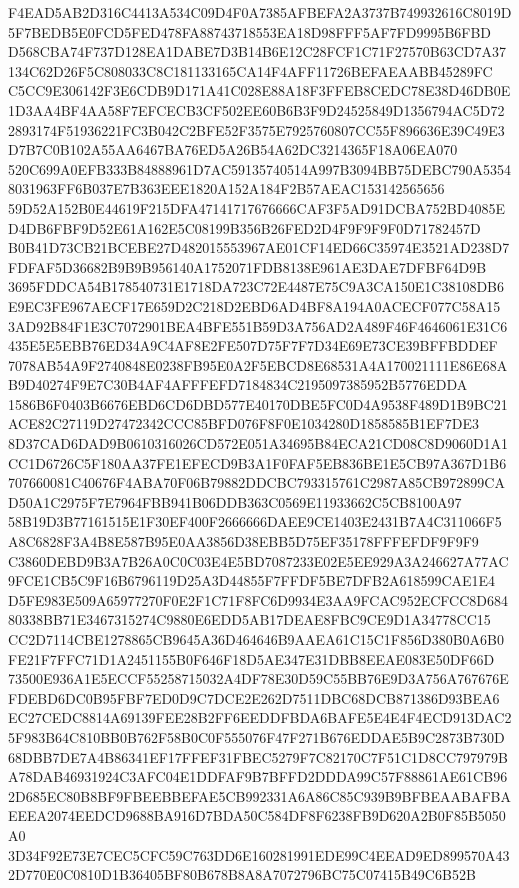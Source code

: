 \documentclass[UTF8,fontset=fandol,zihao=-4,a4paper]{ctexart}
\begin{document}
{{F4EAD5AB2D316C4413A534C09D4F0A7385AFBEFA2A3737B749932616C8019D5F7BEDB5E0FCD5FED478FA88743718553EA18D98FFF5AF7FD9995B6FBD
D568CBA74F737D128EA1DABE7D3B14B6E12C28FCF1C71F27570B63CD7A37134C62D26F5C808033C8C181133165CA14F4AFF11726BEFAEAABB45289FC
C5CC9E306142F3E6CDB9D171A41C028E88A18F3FFEB8CEDC78E38D46DB0E1D3AA4BF4AA58F7EFCECB3CF502EE60B6B3F9D24525849D1356794AC5D72
2893174F51936221FC3B042C2BFE52F3575E7925760807CC55F896636E39C49E3D7B7C0B102A55AA6467BA76ED5A26B54A62DC3214365F18A06EA070
520C699A0EFB333B84888961D7AC59135740514A997B3094BB75DEBC790A53548031963FF6B037E7B363EEE1820A152A184F2B57AEAC153142565656
59D52A152B0E44619F215DFA47141717676666CAF3F5AD91DCBA752BD4085ED4DB6FBF9D52E61A162E5C08199B356B26FED2D4F9F9F9F0D71782457D
B0B41D73CB21BCEBE27D482015553967AE01CF14ED66C35974E3521AD238D7FDFAF5D36682B9B9B956140A1752071FDB8138E961AE3DAE7DFBF64D9B
3695FDDCA54B178540731E1718DA723C72E4487E75C9A3CA150E1C38108DB6E9EC3FE967AECF17E659D2C218D2EBD6AD4BF8A194A0ACECF077C58A15
3AD92B84F1E3C7072901BEA4BFE551B59D3A756AD2A489F46F4646061E31C6435E5E5EBB76ED34A9C4AF8E2FE507D75F7F7D34E69E73CE39BFFBDDEF
7078AB54A9F2740848E0238FB95E0A2F5EBCD8E68531A4A170021111E86E68AB9D40274F9E7C30B4AF4AFFFEFD7184834C2195097385952B5776EDDA
1586B6F0403B6676EBD6CD6DBD577E40170DBE5FC0D4A9538F489D1B9BC21ACE82C27119D27472342CCC85BFD076F8F0E1034280D1858585B1EF7DE3
8D37CAD6DAD9B0610316026CD572E051A34695B84ECA21CD08C8D9060D1A1CC1D6726C5F180AA37FE1EFECD9B3A1F0FAF5EB836BE1E5CB97A367D1B6
707660081C40676F4ABA70F06B79882DDCBC793315761C2987A85CB972899CAD50A1C2975F7E7964FBB941B06DDB363C0569E11933662C5CB8100A97
58B19D3B77161515E1F30EF400F2666666DAEE9CE1403E2431B7A4C311066F5A8C6828F3A4B8E587B95E0AA3856D38EBB5D75EF35178FFFEFDF9F9F9
C3860DEBD9B3A7B26A0C0C03E4E5BD7087233E02E5EE929A3A246627A77AC9FCE1CB5C9F16B6796119D25A3D44855F7FFDF5BE7DFB2A618599CAE1E4
D5FE983E509A65977270F0E2F1C71F8FC6D9934E3AA9FCAC952ECFCC8D68480338BB71E3467315274C9880E6EDD5AB17DEAE8FBC9CE9D1A34778CC15
CC2D7114CBE1278865CB9645A36D464646B9AAEA61C15C1F856D380B0A6B0FE21F7FFC71D1A2451155B0F646F18D5AE347E31DBB8EEAE083E50DF66D
73500E936A1E5ECCF55258715032A4DF78E30D59C55BB76E9D3A756A767676EFDEBD6DC0B95FBF7ED0D9C7DCE2E262D7511DBC68DCB871386D93BEA6
EC27CEDC8814A69139FEE28B2FF6EEDDFBDA6BAFE5E4E4F4ECD913DAC25F983B64C810BB0B762F58B0C0F555076F47F271B676EDDAE5B9C2873B730D
68DBB7DE7A4B86341EF17FFEF31FBEC5279F7C82170C7F51C1D8CC797979BA78DAB46931924C3AFC04E1DDFAF9B7BFFD2DDDA99C57F88861AE61CB96
2D685EC80B8BF9FBEEBBEFAE5CB992331A6A86C85C939B9BFBEAABAFBAEEEA2074EEDCD9688BA916D7BDA50C584DF8F6238FB9D620A2B0F85B5050A0
3D34F92E73E7CEC5CFC59C763DD6E160281991EDE99C4EEAD9ED899570A432D770E0C0810D1B36405BF80B678B8A8A7072796BC75C07415B49C6B52B
}}
\end{document}

